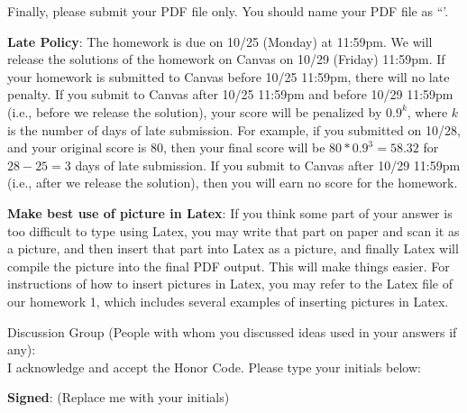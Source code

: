 \documentclass[12pt]{article}
\begin{document}
Finally, please submit your PDF file only. You should name your PDF file as ``{\color{blue}{Firstname-Lastname-NetID.pdf'}}'.


\vspace{.5cm}

\textbf{Late Policy}: The homework is due on 10/25 (Monday) at 11:59pm. We will release the solutions of the homework on Canvas on 10/29 (Friday) 11:59pm. If your homework is submitted to Canvas before 10/25 11:59pm, there will no late penalty. If you submit to Canvas after 10/25 11:59pm and before 10/29 11:59pm (i.e., before we release the solution), your score will be penalized by $0.9^k$, where $k$ is the number of days of late submission. For example, if you submitted on 10/28, and your original score is 80, then your final score will be $80*0.9^3=58.32$ for $28-25=3$ days of late submission. If you submit to Canvas after 10/29 11:59pm (i.e., after we release the solution), then you will earn no score for the homework.

\vspace{.5cm}

\textbf{Make best use of picture in Latex}: If you think some part of your answer is too difficult to type using Latex, you may write that part on paper and scan it as a picture, and then insert that part into Latex as a picture, and finally Latex will compile the picture into the final PDF output. This will make things easier. For instructions of how to insert pictures in Latex, you may refer to the Latex file of our homework 1, which includes several examples of inserting pictures in Latex.


\hrulefill

Discussion Group (People with whom you discussed ideas used in your answers if any):     \\[1ex]


I acknowledge and accept the Honor Code. Please type your initials below:

\textbf{Signed}: ({\color{blue}Replace me with your initials})

\hrulefill

\end{document}
